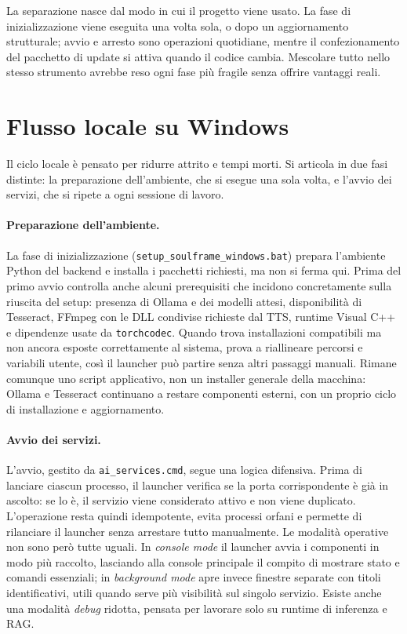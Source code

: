La separazione nasce dal modo in cui il progetto viene usato. La fase di inizializzazione viene eseguita una volta sola, o dopo un aggiornamento strutturale; avvio e arresto sono operazioni quotidiane, mentre il confezionamento del pacchetto di update si attiva quando il codice cambia. Mescolare tutto nello stesso strumento avrebbe reso ogni fase più fragile senza offrire vantaggi reali.

\section{Flusso locale su Windows}
Il ciclo locale è pensato per ridurre attrito e tempi morti. Si articola in due fasi distinte: la preparazione dell'ambiente, che si esegue una sola volta, e l'avvio dei servizi, che si ripete a ogni sessione di lavoro.

\paragraph{Preparazione dell'ambiente.}
La fase di inizializzazione (\texttt{setup\_soulframe\_windows.bat}) prepara l'ambiente Python del backend e installa i pacchetti richiesti, ma non si ferma qui. Prima del primo avvio controlla anche alcuni prerequisiti che incidono concretamente sulla riuscita del setup: presenza di Ollama e dei modelli attesi, disponibilità di Tesseract, FFmpeg con le DLL condivise richieste dal TTS, runtime Visual C++ e dipendenze usate da \texttt{torchcodec}. Quando trova installazioni compatibili ma non ancora esposte correttamente al sistema, prova a riallineare percorsi e variabili utente, così il launcher può partire senza altri passaggi manuali. Rimane comunque uno script applicativo, non un installer generale della macchina: Ollama e Tesseract continuano a restare componenti esterni, con un proprio ciclo di installazione e aggiornamento.

\paragraph{Avvio dei servizi.}
L'avvio, gestito da \texttt{ai\_services.cmd}, segue una logica difensiva. Prima di lanciare ciascun processo, il launcher verifica se la porta corrispondente è già in ascolto: se lo è, il servizio viene considerato attivo e non viene duplicato. L'operazione resta quindi idempotente, evita processi orfani e permette di rilanciare il launcher senza arrestare tutto manualmente. Le modalità operative non sono però tutte uguali. In \emph{console mode} il launcher avvia i componenti in modo più raccolto, lasciando alla console principale il compito di mostrare stato e comandi essenziali; in \emph{background mode} apre invece finestre separate con titoli identificativi, utili quando serve più visibilità sul singolo servizio. Esiste anche una modalità \emph{debug} ridotta, pensata per lavorare solo su runtime di inferenza e RAG.

